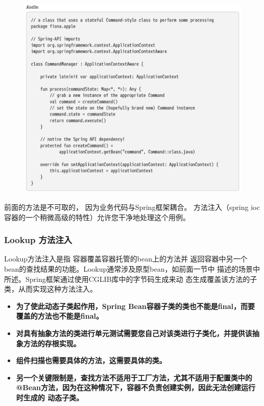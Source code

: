\newpage
\begin{figure}[ht]
    \centering
    \includegraphics[width=1\linewidth]{./Figure/60.png}
\end{figure}

前面的方法是不可取的，
因为业务代码与Spring框架耦合。
方法注入（spring ioc容器的一个稍微高级的特性）允许您干净地处理这个用例。

\subsubsection{Lookup 方法注入}
Lookup方法注入是指
容器覆盖容器托管的bean上的方法并
返回容器中另一个bean的查找结果的功能。Lookup通常涉及原型bean，如前面一节中
描述的场景中所述。Spring框架通过使用CGLIB库中的字节码生成来动
态生成覆盖该方法的子类，从而实现这种方法注入。


\begin{itemize}
    \item \textbf{为了使此动态子类起作用，Spring Bean容器子类的类也不能是final，而要覆盖的方法也不能是final。}
    \item \textbf{对具有抽象方法的类进行单元测试需要您自己对该类进行子类化，并提供该抽象方法的存根实现。}
    \item \textbf{组件扫描也需要具体的方法，这需要具体的类。}
    \item \textbf{另一个关键限制是，查找方法不适用于工厂方法，尤其不适用于配置类中的@Bean方法，因为在这种情况下，容器不负责创建实例，因此无法创建运行时生成的 动态子类。}
\end{itemize}


